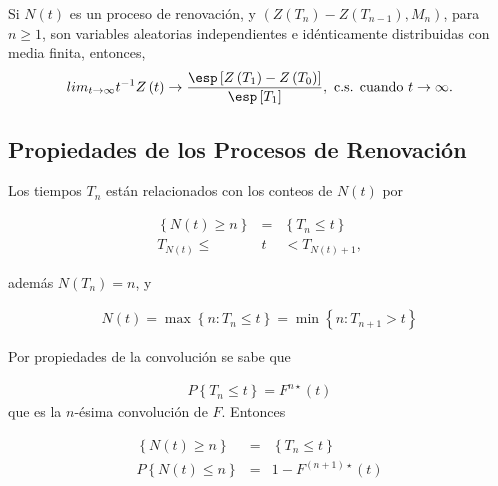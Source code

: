 \begin{Coro}
Si $N\left(t\right)$ es un proceso de renovaci\'on, y $\left(Z\left(T_{n}\right)-Z\left(T_{n-1}\right),M_{n}\right)$, para $n\geq1$, son variables aleatorias independientes e id\'enticamente distribuidas con media finita, entonces,
\begin{eqnarray}
lim_{t\rightarrow\infty}t^{-1}Z\left(t\right)\rightarrow\frac{\esp\left[Z\left(T_{1}\right)-Z\left(T_{0}\right)\right]}{\esp\left[T_{1}\right]},\textrm{ c.s. cuando  }t\rightarrow\infty.
\end{eqnarray}
\end{Coro}



%
\subsection{Propiedades de los Procesos de Renovaci\'on}
%

Los tiempos $T_{n}$ est\'an relacionados con los conteos de $N\left(t\right)$ por

\begin{eqnarray*}
\left\{N\left(t\right)\geq n\right\}&=&\left\{T_{n}\leq t\right\}\\
T_{N\left(t\right)}\leq &t&<T_{N\left(t\right)+1},
\end{eqnarray*}

adem\'as $N\left(T_{n}\right)=n$, y 

\begin{eqnarray*}
N\left(t\right)=\max\left\{n:T_{n}\leq t\right\}=\min\left\{n:T_{n+1}>t\right\}
\end{eqnarray*}

Por propiedades de la convoluci\'on se sabe que

\begin{eqnarray*}
P\left\{T_{n}\leq t\right\}=F^{n\star}\left(t\right)
\end{eqnarray*}
que es la $n$-\'esima convoluci\'on de $F$. Entonces 

\begin{eqnarray*}
\left\{N\left(t\right)\geq n\right\}&=&\left\{T_{n}\leq t\right\}\\
P\left\{N\left(t\right)\leq n\right\}&=&1-F^{\left(n+1\right)\star}\left(t\right)
\end{eqnarray*}

